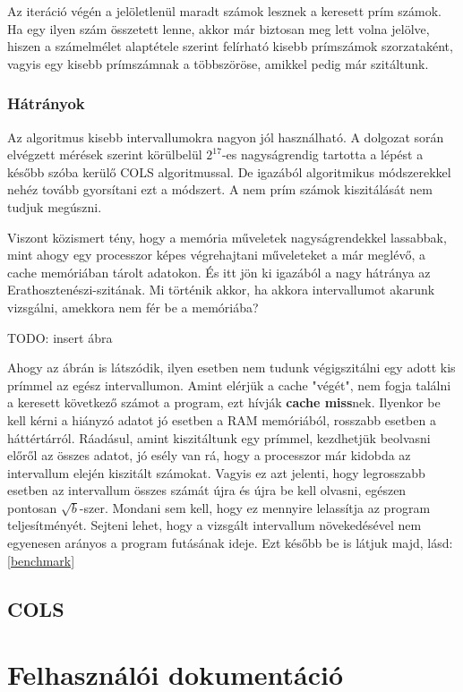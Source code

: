 \documentclass[twoside, a4paper, 12pt]{article}
\begin{document}
\bigskip
Az iteráció végén a jelöletlenül maradt számok lesznek a keresett prím számok. Ha egy ilyen szám összetett lenne, akkor már biztosan meg lett volna jelölve, hiszen a számelmélet alaptétele szerint felírható kisebb prímszámok szorzataként, vagyis egy kisebb prímszámnak a többszöröse, amikkel pedig már szitáltunk.
 \subsubsection{Hátrányok}
Az algoritmus kisebb intervallumokra nagyon jól használható. A dolgozat során elvégzett mérések szerint körülbelül $2^17$-es nagyságrendig tartotta a lépést a később szóba kerülő COLS algoritmussal. De igazából algoritmikus módszerekkel nehéz tovább gyorsítani ezt a módszert. A nem prím számok kiszitálását nem tudjuk megúszni. \par
Viszont közismert tény, hogy a memória műveletek nagyságrendekkel lassabbak, mint ahogy egy processzor képes végrehajtani műveleteket a már meglévő, a cache memóriában tárolt adatokon. És itt jön ki igazából a nagy hátránya az Erathosztenészi-szitának. Mi történik akkor, ha akkora intervallumot akarunk vizsgálni, amekkora nem fér be a memóriába? \par
TODO: insert ábra \par
Ahogy az ábrán is látszódik, ilyen esetben nem tudunk végigszitálni egy adott kis prímmel az egész intervallumon. Amint elérjük a cache "végét", nem fogja találni a keresett következő számot a program, ezt hívják \textbf{cache miss}nek. Ilyenkor be kell kérni a hiányzó adatot jó esetben a RAM memóriából, rosszabb esetben a háttértárról. Ráadásul, amint kiszitáltunk egy prímmel, kezdhetjük beolvasni előről az összes adatot, jó esély van rá, hogy a processzor már kidobda az intervallum elején kiszitált számokat. Vagyis ez azt jelenti, hogy legrosszabb esetben az intervallum összes számát újra és újra be kell olvasni, egészen pontosan $\sqrt{b}$-szer. Mondani sem kell, hogy ez mennyire lelassítja az program teljesítményét. Sejteni lehet, hogy a vizsgált intervallum növekedésével nem egyenesen arányos a program futásának ideje. Ezt később be is látjuk majd, lásd: \ref{benchmark}


\subsection{COLS}

\clearpage
\section{Felhasználói dokumentáció}
\end{document}
